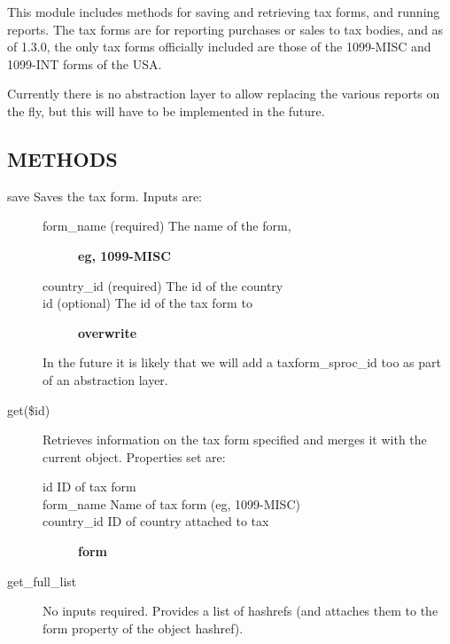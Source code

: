 \begin{description}
\begin{description}
\begin{description}
\begin{description}
\begin{description}
\begin{description}
\begin{description}
\begin{description}
\begin{description}
\begin{description}
This module includes methods for saving and retrieving tax forms, and running
reports.  The tax forms are for reporting purchases or sales to tax bodies, and
as of 1.3.0, the only tax forms officially included are those of the 1099-MISC 
and 1099-INT forms of the USA.



Currently there is no abstraction layer to allow replacing the various reports
on the fly, but this will have to be implemented in the future.

\subsection*{METHODS\label{LedgerSMB::DBObject::TaxFormm_METHODS}}
\begin{description}

\item[{save
Saves the tax form. Inputs are:}] \mbox{}\begin{description}

\item[{form\_name (required) The name of the form,}] \textbf{eg, 1099-MISC}
\item[{country\_id (required) The id of the country}] \mbox{}
\item[{id (optional) The id of the tax form to}] \textbf{overwrite}\end{description}


In the future it is likely that we will add a taxform\_sproc\_id too as part of
an abstraction layer.


\item[{get(\$id)}] \mbox{}

Retrieves information on the tax form specified and merges it with the current
object.  Properties set are:

\begin{description}

\item[{id
ID of tax form}] \mbox{}
\item[{form\_name Name of tax form (eg, 1099-MISC)}] \mbox{}
\item[{country\_id ID of country attached to tax}] \textbf{form}\end{description}

\item[{get\_full\_list}] \mbox{}

No inputs required.  Provides a list of hashrefs (and attaches them to the 
form property of the object hashref).




\end{description}
\end{description}
\end{description}
\end{description}
\end{description}
\end{description}
\end{description}
\end{description}
\end{description}
\end{description}
\end{description}
